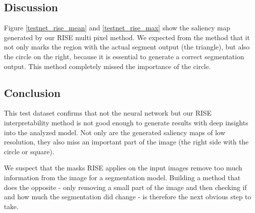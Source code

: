 \subsection{Discussion}
Figure \ref{testnet_rise_mean} and \ref{testnet_rise_max} show the saliency map generated by our RISE multi pixel method. We expected from the method that it not only marks the region with the actual segment output (the triangle), but also the circle on the right, because it is essential to generate a correct segmentation output. This method completely missed the importance of the circle.

\subsection{Conclusion}
This test dataset confirms that not the neural network but our RISE interpretability method is not good enough to generate results with deep insights into the analyzed model. Not only are the generated saliency maps of low resolution, they also miss an important part of the image (the right side with the circle or square).

We suspect that the masks RISE applies on the input images remove too much information from the image for a segmentation model. Building a method that does the opposite - only removing a small part of the image and then checking if and how much the segmentation did change - is therefore the next obvious step to take.
